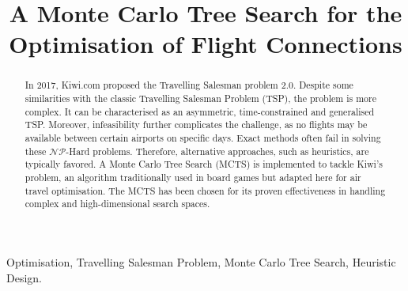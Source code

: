 \documentclass[conference]{IEEEtran}
\begin{document}
\title{A Monte Carlo Tree Search for the
Optimisation of Flight Connections
}

\author{
}


\maketitle

\begin{abstract}
In 2017, Kiwi.com proposed the Travelling Salesman problem 2.0. Despite some similarities with the classic Travelling Salesman Problem (TSP), the problem is more complex. It can be characterised as an asymmetric, time-constrained and generalised TSP. Moreover, infeasibility further complicates the challenge, as no flights may be available between certain airports on specific days. Exact methods often fail in solving these $\mathcal{NP}$-Hard problems. Therefore, alternative approaches, such as heuristics, are typically favored. A Monte Carlo Tree Search (MCTS) is implemented to tackle Kiwi's problem, an algorithm traditionally used in board games but adapted here for air travel optimisation. The MCTS has been chosen for its proven effectiveness in handling complex and high-dimensional search spaces.

\end{abstract}

\begin{IEEEkeywords}
Optimisation, Travelling Salesman Problem, Monte Carlo Tree Search, Heuristic Design.
\end{IEEEkeywords}









\end{document}
